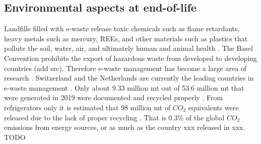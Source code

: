 \subsection{Environmental aspects at end-of-life}

Landfills filled with e-waste release toxic chemicals such as flame retardants, heavy metals such as mercury, REEs, and other materials such as plastics that pollute the soil, water, air, and ultimately human and animal health \cite{javed2024}. The Basel Convention prohibits the export of hazardous waste from developed to developing countries (add src). Therefore e-waste management has become a large area of research \cite{javed2024}. Switzerland and the Netherlands are currently the leading countries in e-waste management \cite{javed2024}.
Only about 9.33 million mt out of 53.6 million mt that were generated in 2019 were documented and recycled properly \cite{javed2024}. From refrigerators only it is estimated that 98 million mt of $CO_2$ equivalents were released due to the lack of proper recycling \cite{javed2024}. That is 0.3\% of the global $CO_2$ emissions from energy sources, or as much as the country xxx released in xxx. TODO


